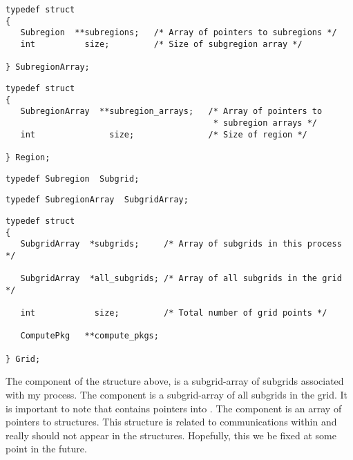 \begin{display}\begin{verbatim}
typedef struct
{
   Subregion  **subregions;   /* Array of pointers to subregions */
   int          size;         /* Size of subgregion array */

} SubregionArray;
\end{verbatim}\end{display}

\begin{display}\begin{verbatim}
typedef struct
{
   SubregionArray  **subregion_arrays;   /* Array of pointers to
                                          * subregion arrays */
   int               size;               /* Size of region */

} Region;
\end{verbatim}\end{display}

\begin{display}\begin{verbatim}
typedef Subregion  Subgrid;
\end{verbatim}\end{display}

\begin{display}\begin{verbatim}
typedef SubregionArray  SubgridArray;
\end{verbatim}\end{display}

\begin{display}\begin{verbatim}
typedef struct
{
   SubgridArray  *subgrids;     /* Array of subgrids in this process */

   SubgridArray  *all_subgrids; /* Array of all subgrids in the grid */

   int            size;         /* Total number of grid points */

   ComputePkg   **compute_pkgs;

} Grid;
\end{verbatim}\end{display}

The  component of the  structure above, is a
subgrid-array of subgrids associated with my process.
The  component is a subgrid-array of all subgrids
in the grid.
It is important to note that  contains pointers into
.
The  component is an array of pointers to
 structures.
This structure is related to communications within \parflow{} and
really should not appear in the  structures.
Hopefully, this we be fixed at some point in the future.

